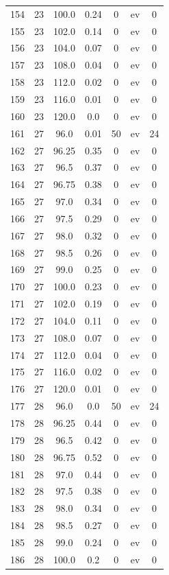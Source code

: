 \documentclass[12pt,a4paper]{article}
\begin{document}
\begin{tabular}{r|cccccc}
	154 & 23 & 100.0 & 0.24 & 0 & ev & 0 \\
	155 & 23 & 102.0 & 0.14 & 0 & ev & 0 \\
	156 & 23 & 104.0 & 0.07 & 0 & ev & 0 \\
	157 & 23 & 108.0 & 0.04 & 0 & ev & 0 \\
	158 & 23 & 112.0 & 0.02 & 0 & ev & 0 \\
	159 & 23 & 116.0 & 0.01 & 0 & ev & 0 \\
	160 & 23 & 120.0 & 0.0 & 0 & ev & 0 \\
	161 & 27 & 96.0 & 0.01 & 50 & ev & 24 \\
	162 & 27 & 96.25 & 0.35 & 0 & ev & 0 \\
	163 & 27 & 96.5 & 0.37 & 0 & ev & 0 \\
	164 & 27 & 96.75 & 0.38 & 0 & ev & 0 \\
	165 & 27 & 97.0 & 0.34 & 0 & ev & 0 \\
	166 & 27 & 97.5 & 0.29 & 0 & ev & 0 \\
	167 & 27 & 98.0 & 0.32 & 0 & ev & 0 \\
	168 & 27 & 98.5 & 0.26 & 0 & ev & 0 \\
	169 & 27 & 99.0 & 0.25 & 0 & ev & 0 \\
	170 & 27 & 100.0 & 0.23 & 0 & ev & 0 \\
	171 & 27 & 102.0 & 0.19 & 0 & ev & 0 \\
	172 & 27 & 104.0 & 0.11 & 0 & ev & 0 \\
	173 & 27 & 108.0 & 0.07 & 0 & ev & 0 \\
	174 & 27 & 112.0 & 0.04 & 0 & ev & 0 \\
	175 & 27 & 116.0 & 0.02 & 0 & ev & 0 \\
	176 & 27 & 120.0 & 0.01 & 0 & ev & 0 \\
	177 & 28 & 96.0 & 0.0 & 50 & ev & 24 \\
	178 & 28 & 96.25 & 0.44 & 0 & ev & 0 \\
	179 & 28 & 96.5 & 0.42 & 0 & ev & 0 \\
	180 & 28 & 96.75 & 0.52 & 0 & ev & 0 \\
	181 & 28 & 97.0 & 0.44 & 0 & ev & 0 \\
	182 & 28 & 97.5 & 0.38 & 0 & ev & 0 \\
	183 & 28 & 98.0 & 0.34 & 0 & ev & 0 \\
	184 & 28 & 98.5 & 0.27 & 0 & ev & 0 \\
	185 & 28 & 99.0 & 0.24 & 0 & ev & 0 \\
	186 & 28 & 100.0 & 0.2 & 0 & ev & 0 \\

\end{tabular}
\end{document}

